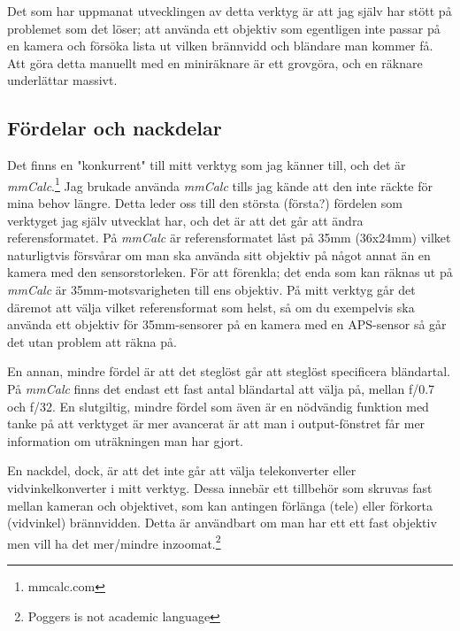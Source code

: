 \documentclass[11pt]{article}
\begin{document}
Det som har uppmanat utvecklingen av detta verktyg är att jag själv har stött på
problemet som det löser; att använda ett objektiv som egentligen inte passar på
en kamera och försöka lista ut vilken brännvidd och bländare man kommer få.
Att göra detta manuellt med en miniräknare är ett grovgöra, och en räknare
underlättar massivt.\par

\subsection{Fördelar och nackdelar}
Det finns en "konkurrent" till mitt verktyg som jag känner till, och det är
\emph{mmCalc}.\footnote{mmcalc.com} Jag brukade använda \emph{mmCalc} tills
jag kände att den inte räckte för mina behov längre. Detta leder oss till den
största {(första?)} fördelen som verktyget jag själv utvecklat har, och det
är att det går att ändra referensformatet. På \emph{mmCalc} är
referensformatet låst på 35mm (36x24mm) vilket naturligtvis försvårar om man
ska använda sitt objektiv på något annat än en kamera med den sensorstorleken.
För att förenkla; det enda som kan räknas ut på \emph{mmCalc} är
35mm-motsvarigheten till ens objektiv. På mitt verktyg går det däremot att välja
vilket referensformat som helst, så om du exempelvis ska använda ett objektiv
för 35mm-sensorer på en kamera med en APS-sensor så går det utan problem att
räkna på. \par
En annan, mindre fördel är att det steglöst går att steglöst
specificera bländartal. På \emph{mmCalc} finns det endast ett fast antal
bländartal att välja på, mellan f/0.7 och f/32. En slutgiltig, mindre fördel
som även är en nödvändig funktion med tanke på att verktyget är mer avancerat
är att man i output-fönstret får mer information om uträkningen man har gjort.
\par

En nackdel, dock, är att det inte går att välja telekonverter eller 
vidvinkelkonverter i mitt verktyg. Dessa innebär ett tillbehör som skruvas
fast mellan kameran och objektivet, som kan antingen förlänga (tele) eller
förkorta (vidvinkel) brännvidden. Detta är användbart om man har ett ett fast
objektiv men vill ha det mer/mindre inzoomat.\footnote{Poggers is not academic
language}\par

\bigskip
\fussy

\bigskip
\bigskip
\bigskip
\bigskip

\end{document}

